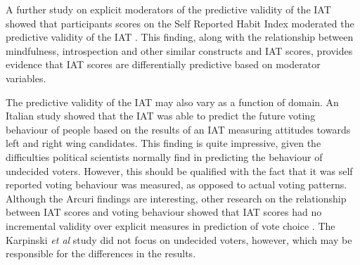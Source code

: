 

A further study on explicit moderators of the predictive validity of the IAT showed that participants scores on the Self Reported Habit Index moderated the predictive validity of the IAT \cite{Conner2007}. This finding, along with the relationship between mindfulness, introspection and other similar constructs and IAT scores, provides evidence that IAT scores are differentially predictive based on moderator variables. 



The predictive validity of the IAT may also vary as a function of domain. An Italian study \cite{Arcuri2008} showed that the IAT was able to predict the future voting behaviour of people based on the results of an IAT measuring attitudes towards left and right wing candidates. This finding is quite impressive, given the difficulties political scientists normally find in predicting the behaviour of undecided voters. However, this should be qualified with the fact that it was self reported voting behaviour was measured, as opposed to actual voting patterns. Although the Arcuri findings are interesting, other research on  the relationship between IAT scores and voting behaviour showed that IAT scores had no incremental validity over explicit measures in prediction of vote choice \cite{Karpinski2005}. The Karpinski \textit{et al } study did not focus on undecided voters, however, which may be responsible for the differences in the results. 


